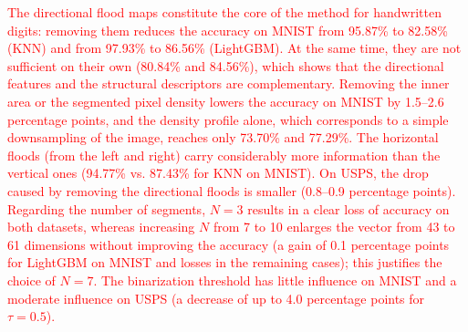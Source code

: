 \documentclass[a4paper,fleqn]{cas-dc}
\begin{document}
\textcolor{red}{The directional flood maps constitute the core of the method for handwritten digits: removing them reduces the accuracy on MNIST from 95.87\% to 82.58\% (KNN) and from 97.93\% to 86.56\% (LightGBM). At the same time, they are not sufficient on their own (80.84\% and 84.56\%), which shows that the directional features and the structural descriptors are complementary. Removing the inner area or the segmented pixel density lowers the accuracy on MNIST by 1.5--2.6 percentage points, and the density profile alone, which corresponds to a simple downsampling of the image, reaches only 73.70\% and 77.29\%. The horizontal floods (from the left and right) carry considerably more information than the vertical ones (94.77\% vs. 87.43\% for KNN on MNIST). On USPS, the drop caused by removing the directional floods is smaller (0.8--0.9 percentage points). Regarding the number of segments, $N = 3$ results in a clear loss of accuracy on both datasets, whereas increasing $N$ from 7 to 10 enlarges the vector from 43 to 61 dimensions without improving the accuracy (a gain of 0.1 percentage points for LightGBM on MNIST and losses in the remaining cases); this justifies the choice of $N = 7$. The binarization threshold has little influence on MNIST and a moderate influence on USPS (a decrease of up to 4.0 percentage points for $\tau = 0.5$).}
\end{document}
